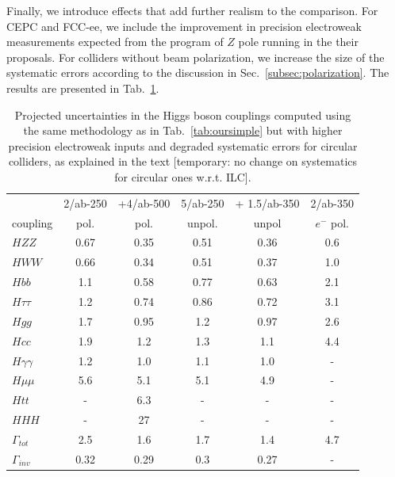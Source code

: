 Finally, we introduce effects that add further realism to the
comparison.  For CEPC and FCC-ee, we include the improvement in
precision electroweak measurements expected from the program of $Z$
pole running in the their proposals.  For colliders without beam
polarization, we increase the size of the systematic errors according
to the discussion in  
Sec.~\ref{subsec:polarization}. The results are presented in 
Tab.~\ref{tab:ournotsosimple}. 

\begin{table}[!htbp]
\begin{center}
\begin{tabular}{l|cc|c|c|c}
 &  2/ab-250 & +4/ab-500 &  5/ab-250 &  + 1.5/ab-350 &  2/ab-350 \\
coupling &  pol.  &   pol.  &   unpol.  &  unpol &  $e^-$  pol. 
  \\  \hline 
$HZZ$            &             0.67&   0.35    &   0.51   & 0.36     &  0.6            \\ 
$HWW$            &         0.66  &   0.34   &   0.51   &   0.37   &   1.0    \\ 
 $Hbb$            &     1.1  &  0.58   &  0.77    &    0.63  &   2.1       \\ 
$H\tau\tau$    &          1.2  &   0.74   &   0.86   &  0.72    &   3.1     \\ 
$Hgg$ &                      1.7  & 0.95       &  1.2    &  0.97    &   2.6    \\ 
$Hcc$                       &   1.9  &  1.2   &   1.3   &   1.1   &    4.4  \\ 
$H\gamma\gamma$ &  1.2 &   1.0     &  1.1    &   1.0   &    -    \\ 
$H\mu\mu$                &  5.6  &  5.1     &  5.1    &  4.9    &    -
 \\ 
$Htt$  &                       -     &      6.3     &  -    &  -    &
-     \\ 
$HHH$                         &  -    &   27     &   -   &   -   &   -
 \\ \hline 
$\Gamma_{tot}$             & 2.5  & 1.6    &   1.7    &  1.4     &
4.7    \\  
$\Gamma_{inv}$          &   0.32  & 0.29    &  0.3    &   0.27   &   -
\\  \hline
\end{tabular}
\end{center}
\caption{ \label{tab:ournotsosimple}    Projected uncertainties in the Higgs
  boson couplings computed using the same methodology as in Tab.~\ref{tab:oursimple} but with higher precision electroweak inputs and degraded systematic errors for circular colliders, as explained in the text [temporary: no change on systematics for circular ones w.r.t. ILC].  }
\end{table}





